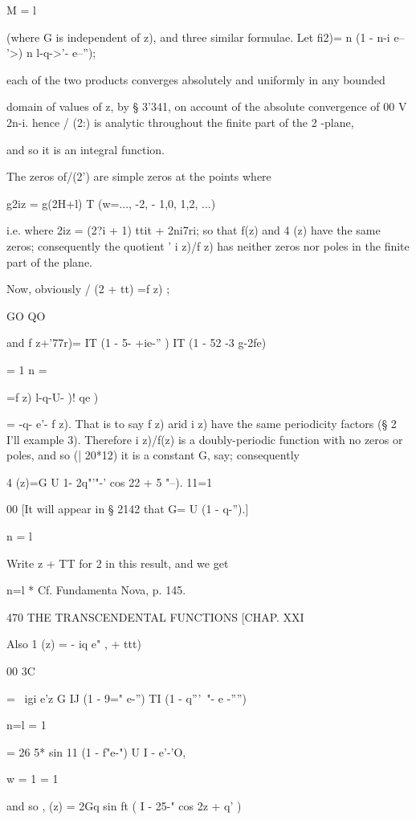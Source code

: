 M = l

(where G is independent of z), and three similar formulae. Let fi2)= n
(1 - n-i e-- '>) n l-q->'- e--'');

each of the two products converges absolutely and uniformly in any
bounded

domain of values of z, by § 3'341, on account of the absolute
convergence of 00 V 2n-i. hence / (2:) is analytic throughout the
finite part of the 2 -plane,

and so it is an integral function.

The zeros of/(2') are simple zeros at the points where

g2iz = g(2H+l) T (w=..., -2, - 1,0, 1,2, ...)

i.e. where 2iz = (2?i + 1) ttit + 2ni7ri; so that f(z) and 4 (z) have
the same zeros; consequently the quotient ' i z)/f z) has neither
zeros nor poles in the finite part of the plane.

Now, obviously / (2 + tt) =f z) ;

GO QO

and f z+'77r)= IT (1 - 5- +ie-'' ) IT (1 - 52 -3 g-2fe)

  = 1 n = \

=f z) l-q-U- )! qe )

= -q- e'- f z). That is to say f z) arid i z) have the same
periodicity factors (§ 2 I'll example 3). Therefore i z)/f(z) is a
doubly-periodic function with no zeros or poles, and so (| 20*12) it
is a constant G, say; consequently

 4 (z)=G U 1- 2q"'"-' cos 22 + 5 "--). 11=1

00 [It will appear in § 2142 that G= U (1 - q-'').]

n = l

Write z + TT for 2 in this result, and we get


n=l * Cf. Fundamenta Nova, p. 145.



470 THE TRANSCENDENTAL FUNCTIONS [CHAP. XXI

Also 1 (z) = - iq e" , + ttt)

00 3C

= \ igi e'z G IJ (1 - 9=" e-'') TI (1 - q'''~"- e -'''')

n=l = 1

= 26 5* sin 11 (1 - f"e-") U I - e'-'O,

w = 1 = 1

and so , (z) = 2Gq sin ft ( I - 25-" cos 2z + q' )

